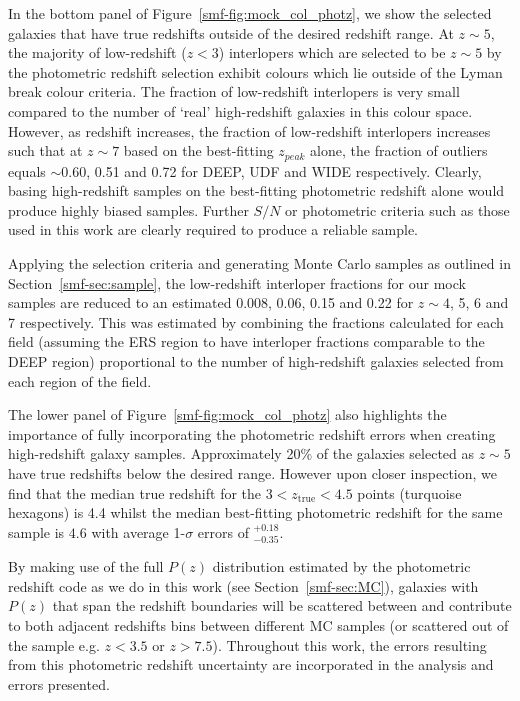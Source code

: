 In the bottom panel of Figure~\ref{smf-fig:mock_col_photz}, we show the selected galaxies that have true redshifts outside of the desired redshift range. At $z\sim 5$, the majority of low-redshift ($z < 3$) interlopers which are selected to be $z\sim5$ by the photometric redshift selection exhibit colours which lie outside of the Lyman break colour criteria. The fraction of low-redshift interlopers is very small compared to the number of `real' high-redshift galaxies in this colour space. However, as redshift increases, the fraction of low-redshift interlopers increases such that at $z \sim 7$ based on the best-fitting $z_{peak}$ alone, the fraction of outliers equals $\sim 0.60$, 0.51 and 0.72 for DEEP, UDF and WIDE respectively. Clearly, basing high-redshift samples on the best-fitting photometric redshift alone would produce highly biased samples. Further $S/N$ or photometric criteria such as those used in this work are clearly required to produce a reliable sample.

Applying the selection criteria and generating Monte Carlo samples as outlined in Section~\ref{smf-sec:sample}, the low-redshift interloper fractions for our mock samples are reduced to an estimated 0.008, 0.06, 0.15 and 0.22 for $z \sim 4$, 5, 6 and 7 respectively. This was estimated by combining the fractions calculated for each field (assuming the ERS region to have interloper fractions comparable to the DEEP region) proportional to the number of high-redshift galaxies selected from each region of the field. 

The lower panel of Figure~\ref{smf-fig:mock_col_photz} also highlights the importance of fully incorporating the photometric redshift errors when creating high-redshift galaxy samples. Approximately 20\% of the galaxies selected as $z\sim5$ have true redshifts below the desired range. However upon closer inspection, we find that the median true redshift for the $3 < z_{\text{true}} < 4.5$ points (turquoise hexagons) is 4.4 whilst the median best-fitting photometric redshift for the same sample is $4.6$ with average 1-$\sigma$ errors of $^{+0.18}_{-0.35}$.

By making use of the full $P(z)$ distribution estimated by the photometric redshift code as we do in this work (see Section~\ref{smf-sec:MC}), galaxies with $P(z)$ that span the redshift boundaries will be scattered between and contribute to both adjacent redshifts bins between different MC samples (or scattered out of the sample e.g. $z < 3.5$ or $z > 7.5$). Throughout this work, the errors resulting from this photometric redshift uncertainty are incorporated in the analysis and errors presented.

